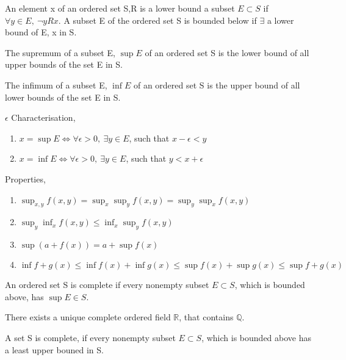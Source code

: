 	\begin{definition}
		An element x of an ordered set S,R is a lower bound a subset $E \subset S$ if $\forall y \in E,\ \neg yRx$. A subset E of the ordered set S is bounded below if $\exists$ a lower bound of E, x in S.
	\end{definition}
	\begin{definition}
		The supremum of a subset E, $\sup E$ of an ordered set S is the lower bound of all upper bounds of the set E in S.
	\end{definition}
	\begin{definition}
		The infimum of a subset E, $\inf E$ of an ordered set S is the upper bound of all lower bounds of the set E in S.
	\end{definition}
	\begin{remark} $\epsilon$ Characterisation,
		\begin{enumerate}
			\item $ x = \sup E \iff \forall \epsilon > 0,\ \exists y \in E$, such that $x-\epsilon < y$
			\item $ x = \inf E \iff \forall \epsilon > 0,\ \exists y \in E$, such that $y < x+\epsilon$
		\end{enumerate}
	\end{remark}
	\begin{remark}Properties,
		\begin{enumerate}
			\item $\sup_{x,y} f(x,y) = \sup_x \sup_y f(x,y) = \sup_y \sup_x f(x,y)$
			\item $\sup_y \inf_x f(x,y) \le \inf_x \sup_y f(x,y)$
			\item $\sup (a + f(x)) = a + \sup f(x)$
			\item $\inf f+g (x) \le \inf f(x) + \inf g(x) \le \sup f(x) + \sup g(x) \le \sup f+g (x)$
		\end{enumerate}
	\end{remark}
	\begin{definition}
		An ordered set S is complete if every nonempty subset $E \subset S$, which is bounded above, has $\sup E \in S$.
	\end{definition}
	\begin{theorem}
		There exists a unique complete ordered field $\mathbb{R}$, that contains $\mathbb{Q}$.
	\end{theorem}
	\begin{axiom}[Completeness]
		A set S is complete, if every nonempty subset $E \subset S$,
		which is bounded above has a least upper bouned in S.
	\end{axiom}

